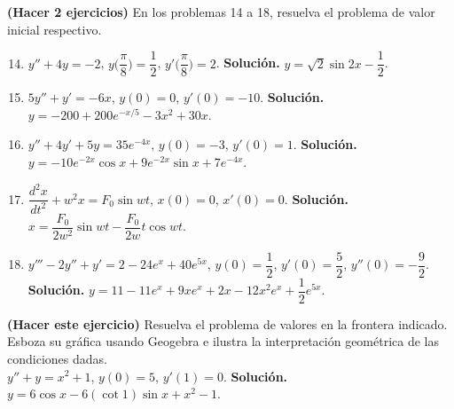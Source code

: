 \documentclass[letterpaper,10pt]{memoir}
\begin{document}
\textbf{(Hacer 2 ejercicios)} En los problemas 14 a 18, resuelva el problema de valor inicial respectivo.
\begin{enumerate}
	\setcounter{enumi}{13}
\item \(y'' +4y=-2\), \(y \Bigg(\dfrac{\pi}{8}\Bigg) = \dfrac{1}{2}\), \(y' \Bigg(\dfrac{\pi}{8}\Bigg) =2\). \textbf{Solución.} \(y= \sqrt{2} \sin 2x- \dfrac{1}{2}\).
\item \(5y'' +y' =-6x\), \(y(0) =0\), \(y' (0) =-10\). \textbf{Solución.} \(y=-200+200e^{-x/5} -3x^2+30x\).
\item \(y'' +4y' +5y=35e^{-4x}\), \(y(0) =-3\), \(y' (0) =1\). \textbf{Solución.} \(y=-10e^{-2x} \cos x+9e^{-2x} \sin x+7e^{-4x}\).
\item \(\dfrac{d^2x}{dt^2} +w^2x=F_0 \sin w t\), \(x(0) =0\), \(x' (0) =0\). \textbf{Solución.} \(x= \dfrac{F_0}{2w^2} \sin wt- \dfrac{F_0}{2w} t \cos wt\).
\item \(y''' -2y'' +y' =2-24e^x+40e^{5x}\), \(y(0) = \dfrac{1}{2}\), \(y' (0) = \dfrac{5 }{2}\), \(y'' (0) = -\dfrac{9}{2}\). \textbf{Solución.} \(y=11-11e^x+9xe^x+2x-12x^2e^x+ \dfrac{1}{2} e^{5x}\).
\end{enumerate}
\textbf{(Hacer este ejercicio)} Resuelva el problema de valores en la frontera indicado. Esboza su gráfica usando Geogebra e ilustra la interpretación geométrica de las condiciones dadas.\\
\(y'' +y=x^2+1\), \(y(0) =5\), \(y'(1) =0\). \textbf{Solución.} \(y=6 \cos x-6(\cot 1) \sin x+x^2-1\).
\end{document}
